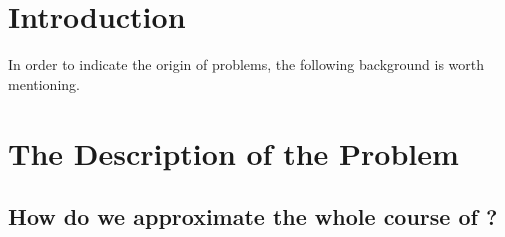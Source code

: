 \documentclass{apmcmthesis}
\begin{document}
\pagestyle{frontmatterstyle}

\begin{abstract}
\verb|apmcmthesis| \LaTeX{} template is designed by \url{https://www.latexstudio.net} for \url{http://www.apmcm.org}. The template is designed to let everyone focus on the content writing of the paper, without spending too much effort on the customization and adjustment of the format.

Note that users need to have some experience with \LaTeX{}, at least some of the features of common macro packages, such as references, math formulas, image usage, list environment, etc. Templates have added commonly used macros. Package, no additional user added.

This template is located on   \url{https://github.com/latexstudio/APMCMThesis}. You can update files from the repository.


\end{abstract}



\newpage
\tableofcontents


\newpage
\pagestyle{mainmatterstyle}
\setcounter{page}{1}
\section{Introduction}
In order to indicate the origin of problems, the following background is worth mentioning.
\subsection{}


\subsection{}



\subsection{}


\section{The Description of the Problem}
\subsection{How do we approximate the whole course of ?}
\end{document}
